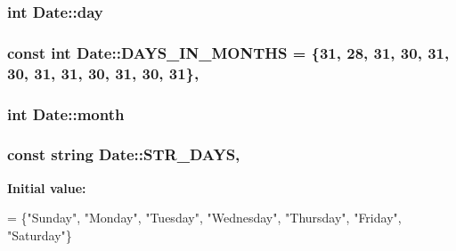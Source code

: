 \subsubsection[{\texorpdfstring{day}{day}}]{\setlength{\rightskip}{0pt plus 5cm}int Date\+::day\hspace{0.3cm}{\ttfamily [private]}}\hypertarget{classDate_a5b192adcabf2b2871e3f0b76c1ec1601}{}\label{classDate_a5b192adcabf2b2871e3f0b76c1ec1601}
\subsubsection[{\texorpdfstring{D\+A\+Y\+S\+\_\+\+I\+N\+\_\+\+M\+O\+N\+T\+HS}{DAYS_IN_MONTHS}}]{\setlength{\rightskip}{0pt plus 5cm}const int Date\+::\+D\+A\+Y\+S\+\_\+\+I\+N\+\_\+\+M\+O\+N\+T\+HS = \{31, 28, 31, 30, 31, 30, 31, 31, 30, 31, 30, 31\}\hspace{0.3cm}{\ttfamily [static]}, {\ttfamily [private]}}\hypertarget{classDate_a2f9826c78c8945c8b584d1e19ea33ade}{}\label{classDate_a2f9826c78c8945c8b584d1e19ea33ade}
\subsubsection[{\texorpdfstring{month}{month}}]{\setlength{\rightskip}{0pt plus 5cm}int Date\+::month\hspace{0.3cm}{\ttfamily [private]}}\hypertarget{classDate_a533843e07c6ac8d19fee9b16f5336ba2}{}\label{classDate_a533843e07c6ac8d19fee9b16f5336ba2}
\subsubsection[{\texorpdfstring{S\+T\+R\+\_\+\+D\+A\+YS}{STR_DAYS}}]{\setlength{\rightskip}{0pt plus 5cm}const string Date\+::\+S\+T\+R\+\_\+\+D\+A\+YS\hspace{0.3cm}{\ttfamily [static]}, {\ttfamily [private]}}\hypertarget{classDate_a9e9df675754c43945320ebbf20c90995}{}\label{classDate_a9e9df675754c43945320ebbf20c90995}
{\bfseries Initial value\+:}
\begin{DoxyCode}
= \{\textcolor{stringliteral}{"Sunday"}, \textcolor{stringliteral}{"Monday"}, \textcolor{stringliteral}{"Tuesday"}, \textcolor{stringliteral}{"Wednesday"},
                                 \textcolor{stringliteral}{"Thursday"}, \textcolor{stringliteral}{"Friday"}, \textcolor{stringliteral}{"Saturday"}\}
\end{DoxyCode}
